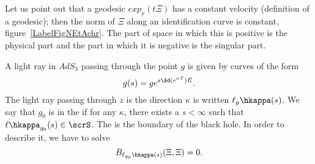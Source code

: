 Let us point out that a geodesic $exp_x(t\Xi)$ has a constant velocity (definition of a geodesic); then the norm of $\Xi$ along an identification curve is constant, figure~\ref{LabelFigNEtAchr}. The part of space in which this is positive is the physical part and the part in which it is negative is the singular part.

\newcommand{\CaptionFigNEtAchr}{The norm (in particular its sing) of \( \Xi\) is constant along a geodesic.}


A light ray in $AdS_3$ passing through the point $g$ is given by curves of the form
\begin{equation}
	g(s)=ge^{s\Ad(e^{\kappa T})E}.
\end{equation}
The light ray passing through $z$ is the direction $\kappa$ is written $\ell_g\hkappa(s)$. We say that $g_0$ is in the  if for any $\kappa$, there exists a $s<\infty$ such that $\ell\hkappa_{g_0}(s)\in\scrS$. The  is the boundary of the black hole. In order to describe it, we have to solve
\begin{equation}
	B_{\ell_{g_0}\hkappa(s)}(\Xi,\Xi)=0.
\end{equation}
